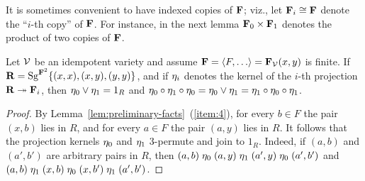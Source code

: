 It is sometimes convenient to have indexed copies of $\mathbf{F}$; viz.,
let $\mathbf{F}_i \cong \mathbf{F}$ denote the ``$i$-th copy'' of $\mathbf{F}$. 
For instance, in the next lemma $\mathbf{F}_0 \times \mathbf{F}_1$ denotes the product of two
copies of $\mathbf{F}$. 
\begin{lemma}
Let $\mathcal{V}$ be an idempotent variety and assume
$\bF = \<F, \dots\> = \bF_{\sV}(x,y)$ is finite.
If $\mathbf{R} = \operatorname{Sg}^{\mathbf{F}^2}\{(x, x), (x, y), (y, y)\}$, and if  
$\eta_i$ denotes the kernel of the
$i$-th projection $\mathbf{R} \twoheadrightarrow \mathbf{F}_i$, then 
$\eta_0 \vee \eta_1 = 1_R$ and 
$\eta_0 \circ \eta_1 \circ \eta_0 = \eta_0 \vee \eta_1 = 
  \eta_1 \circ \eta_0 \circ \eta_1$.
\end{lemma}
\begin{proof}
  By Lemma~\ref{lem:preliminary-facts}~(\ref{item:4}), for every $b \in F$ the
  pair $(x,b)$ lies in $R$, and for every  $a\in F$ the pair $(a,y)$ lies in $R$.
  It follows that the projection kernels $\eta_0$ and $\eta_1$ 3-permute and
  join to $1_R$.
  Indeed, if $(a,b)$ and $(a',b')$ are arbitrary pairs in $R$, then
  $(a,b) \mathrel{\eta_0} (a,y) \mathrel{\eta_1} (a',y) \mathrel{\eta_0} (a',b')$ and 
  $(a,b) \mathrel{\eta_1} (x,b) \mathrel{\eta_0} (x,b') \mathrel{\eta_1} (a',b')$.
\end{proof}



